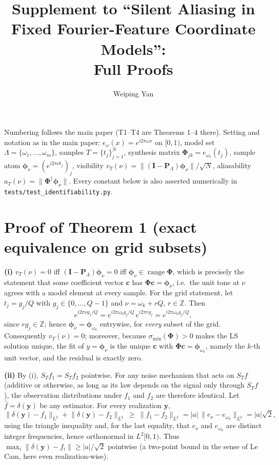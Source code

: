 \documentclass[10pt]{article}
\title{Supplement to ``Silent Aliasing in Fixed Fourier-Feature Coordinate Models'':\\
Full Proofs}
\author{Weiping Yan}
\date{}
\DeclareMathOperator{\range}{range}
\newcommand{\Z}{\mathbb{Z}}
\newcommand{\Lam}{\Lambda}
\newcommand{\Phimat}{\bm{\Phi}}
\newcommand{\norm}[1]{\lVert#1\rVert}
\newcommand{\vt}{v_T}
\newcommand{\at}{a_T}
\begin{document}
\maketitle

Numbering follows the main paper (T1--T4 are Theorems 1--4 there).  Setting and notation
as in the main paper: $e_\omega(x)=e^{i2\pi\omega x}$ on $[0,1)$, model set
$\Lam=\{\omega_1,\dots,\omega_m\}$, samples $T=\{t_j\}_{j=1}^N$, synthesis matrix
$\Phimat_{jk}=e_{\omega_k}(t_j)$, sample atom $\bm\phi_\nu=(e^{i2\pi\nu t_j})_j$,
visibility $\vt(\nu)=\norm{(\bm I-\bm P_\Lam)\bm\phi_\nu}/\sqrt N$, aliasability
$\at(\nu)=\norm{\Phimat^\dagger\bm\phi_\nu}$.  Every constant below is also asserted
numerically in \texttt{tests/test\_identifiability.py}.

\section{Proof of Theorem 1 (exact equivalence on grid subsets)}

\textbf{(i)}  $\vt(\nu)=0$ iff $(\bm I-\bm P_\Lam)\bm\phi_\nu=0$ iff
$\bm\phi_\nu\in\range\Phimat$, which is precisely the statement that some coefficient
vector $\bm c$ has $\Phimat\bm c=\bm\phi_\nu$, i.e.\ the unit tone at $\nu$ agrees with a
model element at every sample.  For the grid statement, let $t_j=g_j/Q$ with
$g_j\in\{0,\dots,Q-1\}$ and $\nu=\omega_k+rQ$, $r\in\Z$.  Then
\[
e^{i2\pi\nu g_j/Q}=e^{i2\pi\omega_k g_j/Q}\,e^{i2\pi r g_j}=e^{i2\pi\omega_k g_j/Q},
\]
since $rg_j\in\Z$; hence $\bm\phi_\nu=\bm\phi_{\omega_k}$ entrywise, for \emph{every}
subset of the grid.  Consequently $\vt(\nu)=0$; moreover, because
$\sigma_{\min}(\Phimat)>0$ makes the LS solution unique, the fit of $y=\bm\phi_\nu$ is
the unique $\bm c$ with $\Phimat\bm c=\bm\phi_{\omega_k}$, namely the $k$-th unit vector,
and the residual is exactly zero.

\textbf{(ii)}  By (i), $S_Tf_1=S_Tf_2$ pointwise.  For any noise mechanism that acts on
$S_Tf$ (additive or otherwise, as long as its law depends on the signal only through
$S_Tf$), the observation distributions under $f_1$ and $f_2$ are therefore identical.
Let $\hat f=\delta(\bm y)$ be any estimator.  For every realization $\bm y$,
\[
\norm{\delta(\bm y)-f_1}_{L^2}+\norm{\delta(\bm y)-f_2}_{L^2}
\ \ge\ \norm{f_1-f_2}_{L^2}=|a|\,\norm{e_\nu-e_{\omega_k}}_{L^2}=|a|\sqrt2,
\]
using the triangle inequality and, for the last equality, that $e_\nu$ and
$e_{\omega_k}$ are distinct integer frequencies, hence orthonormal in $L^2[0,1)$.  Thus
$\max_i\norm{\delta(\bm y)-f_i}\ge|a|/\sqrt2$ pointwise (a two-point bound in the sense
of Le Cam, here even realization-wise).
\end{document}
